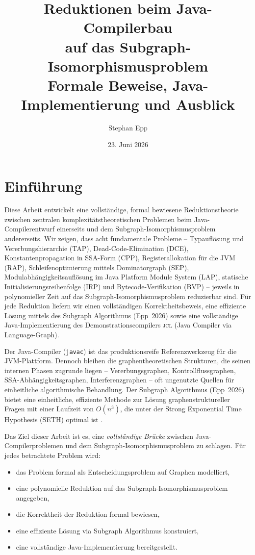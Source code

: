 ﻿\documentclass[a4paper,12pt]{article}
\title{\textbf{Reduktionen beim Java-Compilerbau\\
auf das Subgraph-Isomorphismusproblem}\\[0.1em]
\large Formale Beweise, Java-Implementierung und Ausblick}
\author{Stephan Epp}
\date{23. Juni 2026}
\theoremstyle{definition}
\begin{document}
\sloppy
\maketitle
\tableofcontents
\newpage

\section{Einf\"uhrung}

Diese Arbeit entwickelt eine vollst\"andige, formal bewiesene
Reduktionstheorie zwischen zentralen komplexit\"atstheoretischen
Problemen beim Java-Compilerentwurf einerseits und dem
Subgraph-Iso\-morphismusproblem andererseits.  Wir zeigen, dass acht
fundamentale Probleme -- Typaufl\"osung und Vererbungshierarchie (TAP),
Dead-Code-Elimination (DCE), Konstantenpropagation in SSA-Form (CPP),
Registerallokation f\"ur die JVM (RAP), Schleifenoptimierung mittels
Dominatorgraph (SEP), Modulabh\"angigkeitsaufl\"osung im Java Platform
Module System (LAP), statische Initialisierungsreihenfolge (IRP) und
Bytecode-Verifikation (BVP) -- jeweils in polynomieller Zeit auf das
Subgraph-Isomorphismusproblem reduzierbar sind.  F\"ur jede Reduktion
liefern wir einen vollst\"andigen Korrektheitsbeweis, eine effiziente
L\"osung mittels des Subgraph Algorithmus (Epp~2026) \cite{epp2026}
sowie eine vollst\"andige Java-Implementierung des Demonstrations\-compilers
\textsc{jcl} (Java Compiler via Language-Graph).

Der Java-Compiler (\texttt{javac}) ist das produktionsreife
Referenzwerkzeug f\"ur die JVM-Plattform.  Dennoch bleiben die
graphentheoretischen Strukturen, die seinen internen Phasen zugrunde
liegen -- Vererbungsgraphen, Kontrollflussgraphen,
SSA-Abh\"angigkeitsgraphen, Interferenzgraphen -- oft ungenutzte
Quellen f\"ur einheitliche algorithmische Behandlung.  Der Subgraph
Algorithmus (Epp~2026) bietet eine einheitliche, effiziente Methode
zur L\"osung graphenstruktureller Fragen mit einer Laufzeit von
$O(n^3)$, die unter der Strong Exponential Time Hypothesis (SETH)
optimal ist \cite{abboud2015}.

Das Ziel dieser Arbeit ist es, eine \emph{vollst\"andige Br\"ucke}
zwischen Java-Compilerproblemen und dem Subgraph-Isomorphismusproblem
zu schlagen.  F\"ur jedes betrachtete Problem wird:
\begin{itemize}
    \item das Problem formal als Entscheidungsproblem auf Graphen
          modelliert,
    \item eine polynomielle Reduktion auf das
          Subgraph-Isomorphismusproblem angegeben,
    \item die Korrektheit der Reduktion formal bewiesen,
    \item eine effiziente L\"osung via Subgraph Algorithmus konstruiert,
    \item eine vollst\"andige Java-Implementierung bereitgestellt.
\end{itemize}
\end{document}
